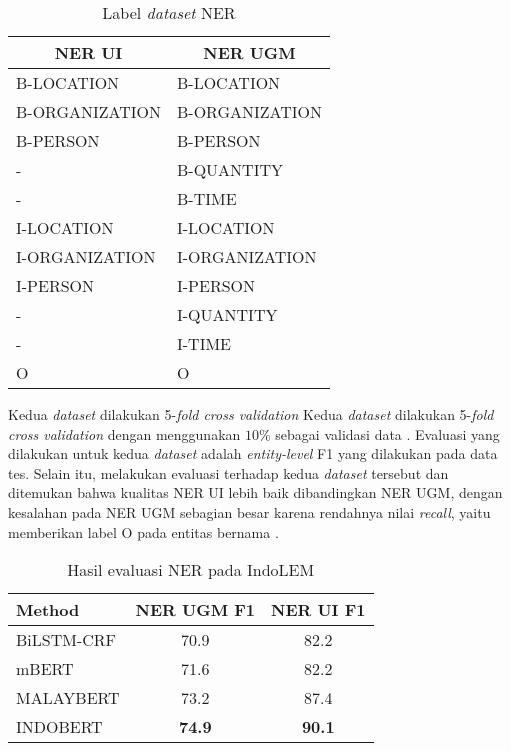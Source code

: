 \begin{table}[h]
    \vspace{0.25cm}
    \centering
    \caption{Label \textit{dataset} NER}
    \label{table:label-ner}
    \begin{tabular}{l|l}
        \toprule
        \multicolumn{1}{c}{\textbf{NER UI}} & \multicolumn{1}{c}{\textbf{NER UGM}} \\
        \midrule
        B-LOCATION & B-LOCATION \\
        B-ORGANIZATION & B-ORGANIZATION \\
        B-PERSON & B-PERSON \\
        - & B-QUANTITY \\
        - & B-TIME \\
        I-LOCATION & I-LOCATION \\
        I-ORGANIZATION & I-ORGANIZATION \\
        I-PERSON & I-PERSON \\
        - & I-QUANTITY \\
        - & I-TIME \\
        O & O \\
        \bottomrule
    \end{tabular}
\end{table}

Kedua \textit{dataset} dilakukan 5-\textit{fold cross validation} Kedua \textit{dataset} dilakukan 5-\textit{fold cross validation} dengan menggunakan $10\%$ sebagai validasi data \parencite{indolem}. Evaluasi yang dilakukan untuk kedua \textit{dataset} adalah \textit{entity-level} F1 yang dilakukan pada data tes. Selain itu, \citeauthor{indolem} melakukan evaluasi terhadap kedua \textit{dataset} tersebut dan ditemukan bahwa kualitas NER UI lebih baik dibandingkan NER UGM, dengan kesalahan pada NER UGM sebagian besar karena rendahnya nilai \textit{recall}, yaitu memberikan label O pada entitas bernama \parencite{indolem}.

\begin{table}[h]
    \vspace{0.25cm}
    \centering
    \caption{Hasil evaluasi NER pada IndoLEM}
    \label{table:indolem-ner-result}
    \begin{tabular}{lcc}
        \toprule
        \textbf{Method} & \textbf{NER UGM F1} & \textbf{NER UI F1} \\
        \midrule
        BiLSTM-CRF & 70.9 & 82.2 \\
        mBERT & 71.6 & 82.2 \\
        MALAYBERT & 73.2 & 87.4 \\
        INDOBERT & \textbf{74.9} & \textbf{90.1} \\
        \bottomrule 
    \end{tabular}
\end{table}

